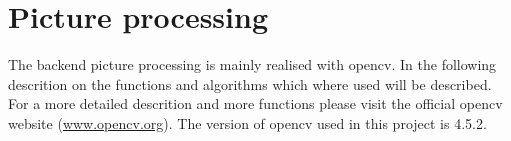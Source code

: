 \author{Florian Müller}
\chapter {Picture processing}

The backend picture processing is mainly realised with opencv.
In the following descrition on the functions and algorithms which where used will be described.
For a more detailed descrition and more functions please visit the official opencv website (\url{www.opencv.org}).
The version of opencv used in this project is 4.5.2.




